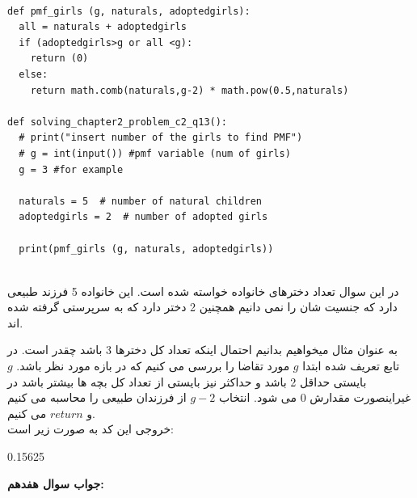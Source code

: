 \documentclass[a4paper,14pt]{article}
\begin{document}
\fontsize{11}{11}\selectfont

\begin{latin}
	\begin{lstlisting}
		
def pmf_girls (g, naturals, adoptedgirls):
  all = naturals + adoptedgirls
  if (adoptedgirls>g or all <g):
    return (0)
  else:
    return math.comb(naturals,g-2) * math.pow(0.5,naturals)

def solving_chapter2_problem_c2_q13():
  # print("insert number of the girls to find PMF")
  # g = int(input()) #pmf variable (num of girls)
  g = 3 #for example

  naturals = 5  # number of natural children
  adoptedgirls = 2  # number of adopted girls

  print(pmf_girls (g, naturals, adoptedgirls))
		
	\end{lstlisting}
\end{latin}
\fontsize{14}{14}\selectfont 


در این سوال  تعداد دخترهای خانواده خواسته شده است. این خانواده 5 فرزند طبیعی دارد که جنسیت شان را نمی دانیم همچنین 2 دختر دارد که به سرپرستی گرفته شده اند.

به عنوان مثال میخواهیم بدانیم احتمال اینکه تعداد کل دخترها 3 باشد چقدر است. در تابع تعریف شده ابتدا $g$ مورد تقاضا را بررسی می کنیم که در بازه مورد نظر باشد. $g$ بایستی حداقل 2 باشد و حداکثر نیز بایستی از تعداد کل بچه ها بیشتر باشد در غیراینصورت مقدارش 0 می شود. انتخاب $g-2$ از فرزندان طبیعی را محاسبه می کنیم و $return$ می کنیم.\\

خروجی این کد به صورت زیر است:\\
\begin{latin}
0.15625
\end{latin}
	
	\textbf{جواب سوال هفدهم:}\\
	
	\fontsize{11}{11}\selectfont
	
\end{document}
